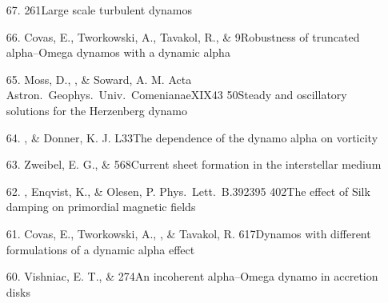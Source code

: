 \begin{itemize}
\item[67.]
\Brandenburg{}
{261}{Large scale turbulent dynamos}

\item[66.]
Covas, E., Tworkowski, A., Tavakol, R., \& \Brandenburg{}
{9}{Robustness of truncated alpha--Omega dynamos with a dynamic alpha}

\item[65.]
Moss, D., \Brandenburg, \& Soward, A. M.
{Acta Astron.\ Geophys.\ Univ.\ Comenianae}{XIX}{43}
{50}{Steady and oscillatory solutions for the Herzenberg dynamo}

\item[64.]
\Brandenburg, \& Donner, K. J.
{L33}{The dependence of the dynamo alpha on vorticity}

\item[63.]
Zweibel, E. G., \& \Brandenburg{}
{568}{Current sheet formation in the interstellar medium}

\item[62.]
\Brandenburg, Enqvist, K., \& Olesen, P.
{Phys.\ Lett.\ B.}{392}{395}
{402}{The effect of Silk damping on primordial magnetic fields}

\item[61.]
Covas, E., Tworkowski, A., \Brandenburg, \& Tavakol, R.
{617}{Dynamos with different formulations of a dynamic alpha effect}

\item[60.]
Vishniac, E. T., \& \Brandenburg{}
{274}{An incoherent alpha--Omega dynamo in accretion disks}


\end{itemize}
